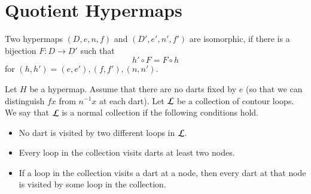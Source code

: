 %
%
%
%
%
%




\section{Quotient Hypermaps}


\begin{definition} Two hypermaps $(D,e,n,f)$ and $(D',e',n',f')$ are
isomorphic, if there is a bijection $F:D\to D'$ such that
    $$h'\circ F = F\circ h$$
for $(h,h')=(e,e'), (f,f'), (n,n')$.
\end{definition}


\begin{definition}
Let $H$ be a hypermap. Assume that 
there are no darts fixed by $e$ (so that we can distinguish $f x$
from $n^{-1} x$ at each dart). 
Let $\cal L$ be a collection of contour
loops.  We say that $\cal L$ is a normal collection if the following
conditions hold. \begin{itemize}
 \item No dart is visited by two different loops in $\cal
L$.
 \item Every loop in the
collection visits darts at least two nodes.
 \item If a loop in the
 collection visits a dart at a node, then every dart at that node is
 visited by some loop in the collection.
\end{itemize}
\end{definition}

